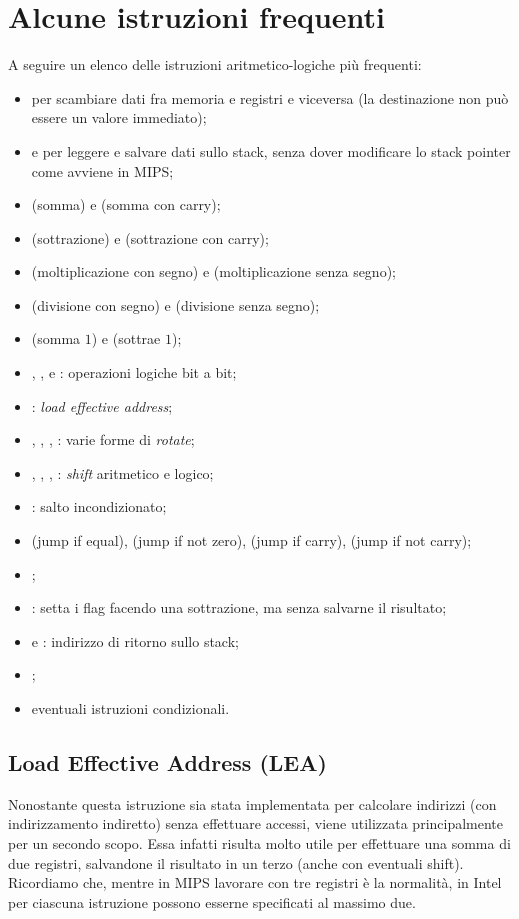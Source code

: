 \documentclass[class=book, crop=false, oneside]{standalone}
\begin{document}
\section{Alcune istruzioni frequenti}
A seguire un elenco delle istruzioni aritmetico-logiche più frequenti:
\begin{itemize}
	\item {} per scambiare dati fra memoria e registri e viceversa (la destinazione non può essere un valore immediato);
	\item {} e  per leggere e salvare dati sullo stack, senza dover modificare lo stack pointer come avviene in MIPS;
	\item {} (somma) e  (somma con carry);
	\item {} (sottrazione) e  (sottrazione con carry);
	\item {} (moltiplicazione con segno) e  (moltiplicazione senza segno);
	\item {} (divisione con segno) e  (divisione senza segno);
	\item {} (somma \(1\)) e  (sottrae \(1\));
	\item {}, ,  e : operazioni logiche bit a bit;
	\item {}: \emph{load effective address};
	\item {}, , , : varie forme di \emph{rotate};
	\item {}, , , : \emph{shift} aritmetico e logico;
	\item {}: salto incondizionato;
	\item {} (jump if equal),  (jump if not zero),  (jump if carry),  (jump if not carry);
	\item {};
	\item {}: setta i flag facendo una sottrazione, ma senza salvarne il risultato;
	\item {} e : indirizzo di ritorno sullo stack;
	\item {};
	\item eventuali istruzioni condizionali.
\end{itemize}

\subsection{Load Effective Address (LEA)}
Nonostante questa istruzione sia stata implementata per calcolare indirizzi (con indirizzamento indiretto) senza effettuare accessi, viene utilizzata principalmente per un secondo scopo. Essa infatti risulta molto utile per effettuare una somma di due registri, salvandone il risultato in un terzo (anche con eventuali shift). Ricordiamo che, mentre in MIPS lavorare con tre registri è la normalità, in Intel per ciascuna istruzione possono esserne specificati al massimo due.
\end{document}
